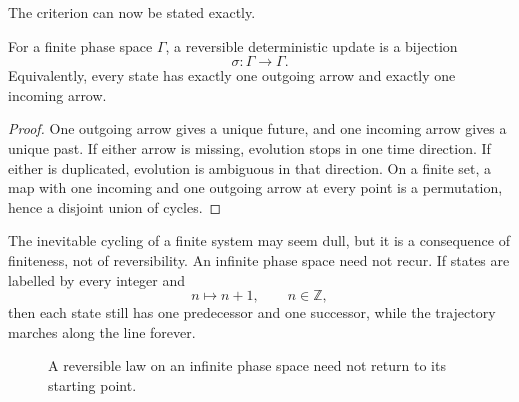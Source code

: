 \begin{classroomqa}

\end{classroomqa}

The criterion can now be stated exactly.

\begin{proposition}
For a finite phase space \(\Gamma\), a reversible deterministic update is a bijection
\begin{equation}
 \sigma:\Gamma\longrightarrow\Gamma.
\end{equation}
Equivalently, every state has exactly one outgoing arrow and exactly one incoming arrow.
\end{proposition}

\begin{proof}
One outgoing arrow gives a unique future, and one incoming arrow gives a unique past. If either arrow is missing, evolution stops in one time direction. If either is duplicated, evolution is ambiguous in that direction. On a finite set, a map with one incoming and one outgoing arrow at every point is a permutation, hence a disjoint union of cycles.
\end{proof}

The inevitable cycling of a finite system may seem dull, but it is a consequence of finiteness, not of reversibility. An infinite phase space need not recur. If states are labelled by every integer and
\begin{equation}
 n\mapsto n+1,
 \qquad n\in\mathbb Z,
\end{equation}
then each state still has one predecessor and one successor, while the trajectory marches along the line forever.

\begin{figure}[htbp]
\centering
{}
\caption{A reversible law on an infinite phase space need not return to its starting point.}
\label{fig:l01-infinite-chain}
\end{figure}

